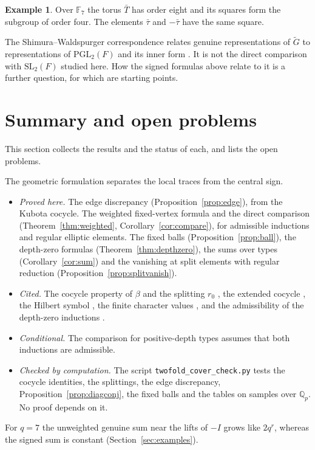 \documentclass[12pt,letterpaper]{article}
\numberwithin{equation}{section}
\theoremstyle{definition}
\newtheorem{example}[theorem]{Example}
\theoremstyle{remark}
\newcommand{\Mp}{\widetilde G}
\begin{document}
\begin{example}
Over $\mathbb F_7$ the torus $\bar T$ has order eight and its squares form the subgroup of order four. The elements $\bar\tau$ and $-\bar\tau$ have the same square.
\end{example}

The Shimura--Waldspurger correspondence relates genuine representations of $\Mp$ to representations of $\mathrm{PGL}_2(F)$ and its inner form \cite{Wa91}. It is not the direct comparison with $\mathrm{SL}_2(F)$ studied here. How the signed formulas above relate to it is a further question, for which \cite{Wa91,Ma04} are starting points.

\section{Summary and open problems}\label{sec:summary}
This section collects the results and the status of each, and lists the open problems.

The geometric formulation separates the local traces from the central sign.
\begin{itemize}[leftmargin=2em]
\item \emph{Proved here.} The edge discrepancy (Proposition~\ref{prop:edge}), from the Kubota cocycle. The weighted fixed-vertex formula and the direct comparison (Theorem~\ref{thm:weighted}, Corollary~\ref{cor:compare}), for admissible inductions and regular elliptic elements. The fixed balls (Proposition~\ref{prop:ball}), the depth-zero formulas (Theorem~\ref{thm:depthzero}), the sums over types (Corollary~\ref{cor:sum}) and the vanishing at split elements with regular reduction (Proposition~\ref{prop:splitvanish}).
\item \emph{Cited.} The cocycle property of $\beta$ and the splitting $r_0$ \cite{Ku67,Ge76}, the extended cocycle \cite{Ge76}, the Hilbert symbol \cite{Ne86}, the finite character values \cite{DL76,Bo11}, and the admissibility of the depth-zero inductions \cite{MP94,HW09}.
\item \emph{Conditional.} The comparison for positive-depth types assumes that both inductions are admissible.
\item \emph{Checked by computation.} The script \texttt{twofold\_cover\_check.py} tests the cocycle identities, the splittings, the edge discrepancy, Proposition~\ref{prop:diagconj}, the fixed balls and the tables on samples over $\mathbb Q_p$. No proof depends on it.
\end{itemize}
For $q=7$ the unweighted genuine sum near the lifts of $-I$ grows like $2q^r$, whereas the signed sum is constant (Section~\ref{sec:examples}).
\end{document}
